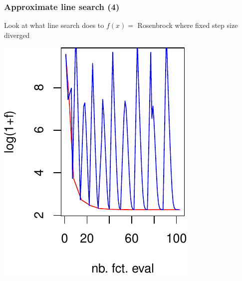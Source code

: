 \documentclass[12pt]{beamer}
\begin{document}
\begin{frame}
\frametitle{Approximate line search (4)} 
Look at what line search does to $f(x)=$ Rosenbrock where fixed step size diverged
\begin{center}
\begin{minipage}[b]{0.3\textwidth}
\includegraphics[width=\textwidth]{gradient_rosen_LS_f-crop.pdf} 
\end{minipage}
\hspace{1.cm}
\begin{minipage}[b]{0.3\textwidth}

\end{minipage}
\end{center}
\end{frame}
\end{document}
